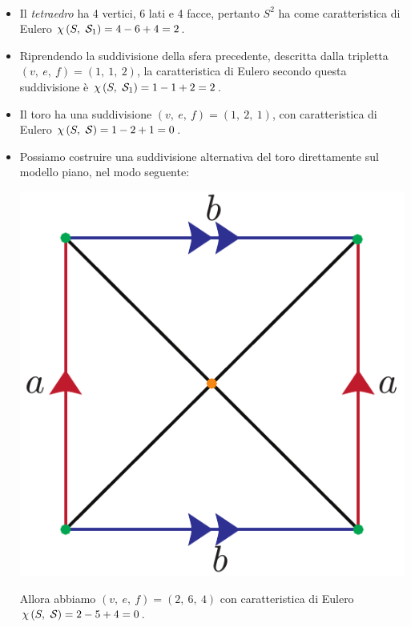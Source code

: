 \begin{examples}~{}
	\begin{itemize}
		\item Il \textit{tetraedro} ha 4 vertici, 6 lati e 4 facce, pertanto $S^2$ ha come caratteristica di Eulero $\euler{S}{\mathcal{S}_1}=4-6+4=2$.
		\item Riprendendo la suddivisione della sfera precedente, descritta dalla tripletta $\left(v,\ e,\ f\right)=\left(1,\ 1,\ 2\right)$, la caratteristica di Eulero secondo questa suddivisione è $\euler{S}{\mathcal{S}_1}=1-1+2=2$.
		\item Il toro ha una suddivisione $\left(v,\ e,\ f\right)=\left(1,\ 2,\ 1\right)$, con caratteristica di Eulero $\euler{S}{\mathcal{S}}=1-2+1=0$.
		\item Possiamo costruire una suddivisione alternativa del toro direttamente sul modello piano, nel modo seguente:
		\begin{center}
			\includegraphics[trim=0cm 0cm 0cm 0cm, clip, scale=0.35]{images/torusmodelplane.pdf}
		\end{center}
	Allora abbiamo $\left(v,\ e,\ f\right)=\left(2,\ 6,\ 4\right)$ con caratteristica di Eulero $\euler{S}{\mathcal{S}}=2-5+4=0$.
	\end{itemize}
\vspace{-3mm}
\end{examples}
